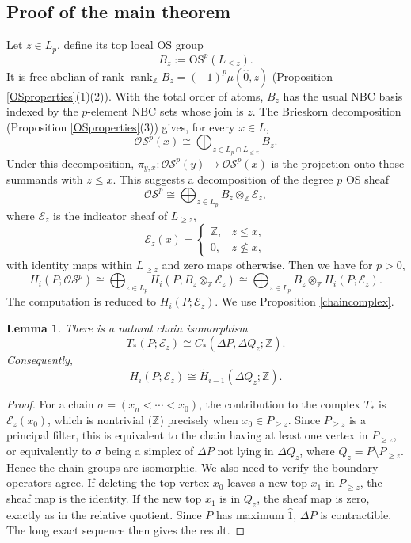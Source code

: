 \documentclass{amsart}
\numberwithin{equation}{section}
\theoremstyle{plain}
\newtheorem{lem}[thm]{Lemma}
\theoremstyle{remark}
\theoremstyle{definition}
\numberwithin{equation}{section}
\newcommand{\Z}{\mathbb{Z}}
\newcommand{\E}{\mathscr{E}}
\newcommand{\OS}{\mathrm{OS}}
\newcommand{\sOS}{\mathscr{OS}}
\DeclareMathOperator{\rank}{rank}
\begin{document}
\subsection{Proof of the main theorem}
Let $z\in L_p$, define its top local OS group
\[
B_z:=\OS^p(L_{\leq z}).
\]
It is free abelian of rank $\rank_{\Z}B_z=(-1)^{p}\mu(\hat{0},z)$ (Proposition \ref{OSproperties}(1)(2)). With the total order of atoms, $B_z$ has the usual NBC basis indexed by the $p$-element NBC sets whose join is $z$. The Brieskorn decomposition (Proposition \ref{OSproperties}(3)) gives, for every $x\in L$,
\[
\sOS^p(x)\cong \bigoplus_{z\in L_p\cap L_{\leq x}}B_z.
\]
Under this decomposition, $\pi_{y,x}:\sOS^p(y)\to\sOS^p(x)$ is the projection onto those summands with $z\leq x$. This suggests a decomposition of the degree $p$ OS sheaf
\[
\sOS^p\cong \bigoplus_{z\in L_p} B_z\otimes_{\Z}\E_z,
\]
where $\E_z$ is the indicator sheaf of $L_{\geq z}$,
\[
\E_z(x)=\begin{cases}
    \Z, & z\leq x,\\
    0, & z\not\leq x,
\end{cases}
\]
with identity maps within $L_{\geq z}$ and zero maps otherwise. Then we have for $p>0$,
\[
H_i(P;\sOS^p)\cong \bigoplus_{z\in L_p} H_i(P;B_z\otimes_{\Z}\E_z)\cong \bigoplus_{z\in L_p}B_z\otimes_{\Z}H_i(P;\E_z).
\]
The computation is reduced to $H_i(P;\E_z)$. We use Proposition \ref{chaincomplex}.
\begin{lem}
    There is a natural chain isomorphism
    \[
    T_*(P;\E_z)\cong C_*(\Delta P,\Delta Q_z;\Z).
    \]
    Consequently,
    \[
    H_i(P;\E_z)\cong \widetilde{H}_{i-1}(\Delta Q_z;\Z).
    \]
\end{lem}
\begin{proof}
    For a chain $\sigma=(x_n<\cdots< x_0)$, the contribution to the complex $T_*$ is $\E_z(x_0)$, which is nontrivial ($\Z$) precisely when $x_0\in P_{\geq z}$. Since $P_{\geq z}$ is a principal filter, this is equivalent to the chain having at least one vertex in $P_{\geq z}$, or equivalently to $\sigma$ being a simplex of $\Delta P$ not lying in $\Delta Q_z$, where $Q_z=P\setminus P_{\geq z}$. Hence the chain groups are isomorphic. We also need to verify the boundary operators agree. If deleting the top vertex $x_0$ leaves a new top $x_1$ in $P_{\geq z}$, the sheaf map is the identity. If the new top $x_1$ is in $Q_z$, the sheaf map is zero, exactly as in the relative quotient. Since $P$ has maximum $\hat{1}$, $\Delta P$ is contractible. The long exact sequence then gives the result.
\end{proof}
\end{document}

